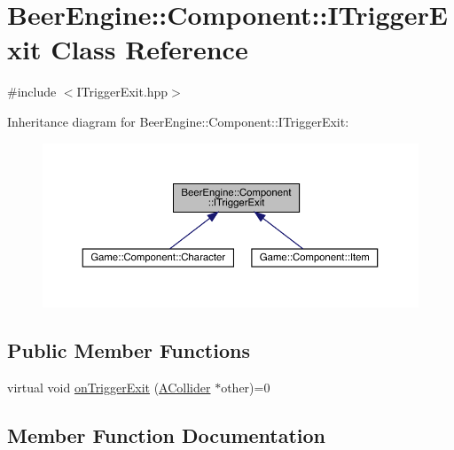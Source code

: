 \hypertarget{class_beer_engine_1_1_component_1_1_i_trigger_exit}{}\section{Beer\+Engine\+:\+:Component\+:\+:I\+Trigger\+Exit Class Reference}
\label{class_beer_engine_1_1_component_1_1_i_trigger_exit}


{\ttfamily \#include $<$I\+Trigger\+Exit.\+hpp$>$}



Inheritance diagram for Beer\+Engine\+:\+:Component\+:\+:I\+Trigger\+Exit\+:
\nopagebreak
\begin{figure}[H]
\begin{center}
\leavevmode
\includegraphics[width=350pt]{class_beer_engine_1_1_component_1_1_i_trigger_exit__inherit__graph}
\end{center}
\end{figure}
\subsection*{Public Member Functions}
\begin{DoxyCompactItemize}
\item 
virtual void \mbox{\hyperlink{class_beer_engine_1_1_component_1_1_i_trigger_exit_ad5bc744f738cb2c52de40b243954967f}{on\+Trigger\+Exit}} (\mbox{\hyperlink{class_beer_engine_1_1_component_1_1_a_collider}{A\+Collider}} $\ast$other)=0
\end{DoxyCompactItemize}


\subsection{Member Function Documentation}
\mbox{\label{class_beer_engine_1_1_component_1_1_i_trigger_exit_ad5bc744f738cb2c52de40b243954967f}} 
